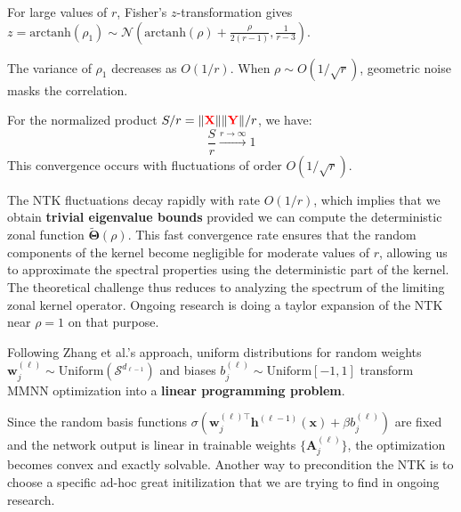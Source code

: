 \documentclass[a4paper]{article}
\theoremstyle{plain}
\theoremstyle{definition}
\theoremstyle{remark}
\begin{document}
\begin{tcolorbox}[colback=green!10,colframe=green,title={\textbf{High-Dimensional Behavior}},enhanced]
For large values of $r$, Fisher's $z$-transformation gives $z = \text{arctanh}(\rho_1) \sim \mathcal{N}\left(\text{arctanh}(\rho) + \frac{\rho}{2(r-1)}, \frac{1}{r-3}\right)$. 

The variance of $\rho_1$ decreases as $O(1/r)$. When $\rho \sim O(1/\sqrt{r})$, geometric noise masks the correlation.

For the normalized product $S/r = \|\textcolor{red}{\mathbf{X}}\|\|\textcolor{red}{\mathbf{Y}}\|/r$, we have:
\begin{equation}
\boxed{\frac{S}{r} \xrightarrow{r \to \infty} 1}
\end{equation}
This convergence occurs with fluctuations of order $O(1/\sqrt{r})$.
\end{tcolorbox}

\begin{tcolorbox}[colback=green!10,colframe=green!80!black,title={\textbf{Remark: Fast Decay of NTK Fluctuations}},enhanced,drop shadow,boxrule=2pt]
The NTK fluctuations decay rapidly with rate $O(1/r)$, which implies that we obtain \textbf{trivial eigenvalue bounds} provided we can compute the deterministic zonal function $\boldsymbol{\tilde{\Theta}}(\rho)$. This fast convergence rate ensures that the random components of the kernel become negligible for moderate values of $r$, allowing us to approximate the spectral properties using the deterministic part of the kernel. The theoretical challenge thus reduces to analyzing the spectrum of the limiting zonal kernel operator.
Ongoing research is doing a taylor expansion of the NTK near $\rho =1$ on that purpose.
\end{tcolorbox}

\begin{tcolorbox}[colback=green!10,colframe=green!80!black,title={\textbf{Computational Insight: Linear Programming Formulation}},enhanced,drop shadow,boxrule=2pt]
Following Zhang et al.'s approach, uniform distributions for random weights $\bm{w}_j^{(\ell)} \sim \text{Uniform}(\mathcal{S}^{d_{\ell-1}})$ and biases $b_j^{(\ell)} \sim \text{Uniform}[-1,1]$ transform MMNN optimization into a \textbf{linear programming problem}.

Since the random basis functions $\sigma(\bm{w}_j^{(\ell)\top} \bm{h}^{(\ell-1)}(\bm{x}) + \beta b_j^{(\ell)})$ are fixed and the network output is linear in trainable weights $\{\bm{A}_j^{(\ell)}\}$, the optimization becomes convex and exactly solvable.
Another way to precondition the NTK is to choose a specific ad-hoc great initilization that we are trying to find in ongoing research.
\end{tcolorbox}
\end{document}
